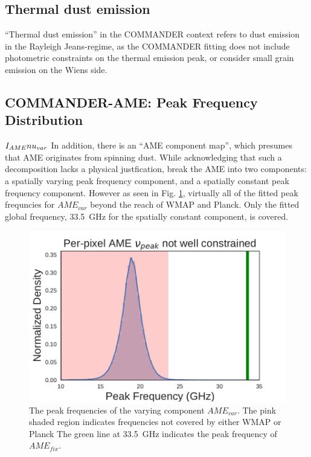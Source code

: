       \subsection{Thermal dust emission}

      ``Thermal dust emission'' in the COMMANDER context refers to dust emission in the Rayleigh Jeans-regime, as the COMMANDER fitting does not include photometric constraints on the thermal emission peak, or consider small grain emission on the Wiens side.

       \subsection{COMMANDER-AME: Peak Frequency Distribution}

        $I_{AME}\\nu_{var}$
        In addition, there is an ``AME component map'', which presumes that AME originates from spinning dust. While acknowledging that such a decomposition lacks a physical justfication, \cite{planck15X} break the AME into two components: a spatially varying peak frequency component, and a spatially constant peak frequency component. However as seen in Fig. \ref{fig:AME_commander_freqdist}, virtually all of the fitted peak frequncies for $AME_{var}$ beyond the reach of WMAP and Planck. Only the fitted global frequency, 33.5~GHz for the spatially constant component, is covered.


        \begin{figure}
          \label{fig:AME_commander_freqdist}
          \includegraphics[width=\textwidth]{../Plots/ch_intro/AME_commander_freqdist.pdf}
          \centering
          \caption{The peak frequencies of the varying component $AME_{var}$.  The pink shaded region indicates frequencies not covered by either WMAP or Planck The green line at 33.5~GHz indicates the peak frequency of $AME_{fix}$.}
        \end{figure}

